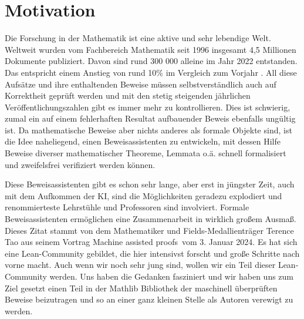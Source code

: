 \documentclass[10pt]{article}
\begin{document}



\clearpage

\setcounter{page}{1}
\section{Motivation} %
Die Forschung in der Mathematik ist eine aktive und sehr lebendige Welt. Weltweit wurden vom Fachbereich Mathematik seit 1996 insgesamt 4,5 Millionen Dokumente publiziert. Davon sind rund 300 000 alleine im Jahr 2022 entstanden. Das entspricht einem Anstieg von rund 10\% im Vergleich zum Vorjahr \cite{Q1}. All diese Aufsätze und ihre enthaltenden Beweise müssen selbstverständlich auch auf Korrektheit geprüft werden und mit den stetig steigenden jährlichen Veröffentlichungszahlen gibt es immer mehr zu kontrollieren. Dies ist schwierig, zumal ein auf einem fehlerhaften Resultat aufbauender Beweis ebenfalls ungültig ist. Da mathematische Beweise aber nichts anderes als formale Objekte sind, ist die Idee naheliegend, einen Beweisassistenten zu entwickeln, mit dessen Hilfe Beweise diverser mathematischer Theoreme, Lemmata o.ä. schnell formalisiert und zweifelsfrei verifiziert werden können. 

\noindent Diese Beweisassistenten gibt es schon sehr lange, aber erst in jüngster Zeit, auch mit dem Aufkommen der KI, sind die Möglichkeiten geradezu explodiert und renommierteste Lehrstühle und Professoren sind involviert. \glqq  Formale Beweisassistenten ermöglichen eine Zusammenarbeit in wirklich großem Ausmaß\grqq. Dieses Zitat stammt von dem Mathematiker und Fields-Medallienträger Terence Tao aus seinem Vortrag \glqq Machine assisted proofs\grqq~vom 3. Januar 2024. Es hat sich eine Lean-Community gebildet, die hier intensivst forscht und große Schritte nach vorne macht. Auch wenn wir noch sehr jung sind, wollen wir ein Teil dieser Lean-Community werden. Uns haben die Gedanken fasziniert und wir haben uns zum Ziel gesetzt einen Teil in der Mathlib Bibliothek der maschinell überprüften Beweise beizutragen und so an einer ganz kleinen Stelle als Autoren verewigt zu werden.\par
\end{document}
